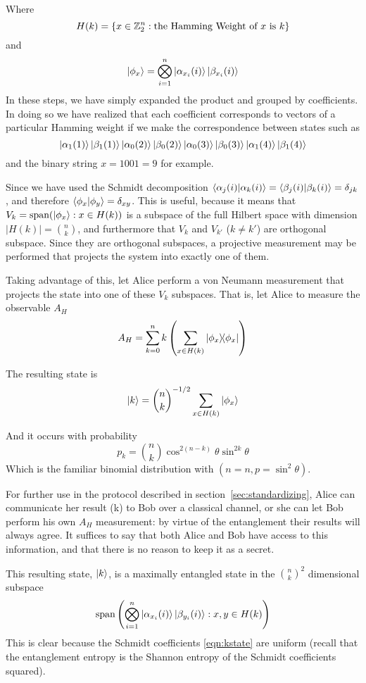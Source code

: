 Where 
$$
H(k) = \left\{ 
x \in \mathbb{Z}_2^n : \text{the Hamming Weight of $x$ is $k$} 
\right\}
$$
and
$$
\ket{\phi_x} = \bigotimes_{i=1}^n 
\ket{\alpha_{x_i}(i)} \ket{\beta_{x_i}(i)}
$$
In these steps, we have simply expanded the product and grouped by coefficients. In doing so we have realized that each coefficient corresponds to vectors of a particular Hamming weight if we make the correspondence between states such as
$$\ket{\alpha_1(1)} \ket{\beta_1(1)} \ket{\alpha_0(2)} \ket{\beta_0(2)} \ket{\alpha_0(3)} \ket{\beta_0(3)} \ket{\alpha_1(4)} \ket{\beta_1(4)}$$
and the binary string $x = 1001 = 9$ for example.

Since we have used the Schmidt decomposition $ \braket{\alpha_j(i)}{\alpha_k(i)} = \braket{\beta_j(i)}{\beta_k(i)} = \delta_{jk} $, and therefore $\braket{\phi_x}{\phi_y} = \delta_{xy}$.
This is useful, because it means that $V_k = \text{span}(\ket{\phi_x} : x \in H(k))$ is a subspace of the full Hilbert space with dimension $|H(k)| = \binom{n}{k}$, and furthermore that $V_k$ and $V_{k'}$ ($k\neq k'$) are orthogonal subspace.
Since they are orthogonal subspaces, a projective measurement may be performed that projects the system into exactly one of them.

Taking advantage of this, let Alice perform a von Neumann measurement that projects the state into one of these $V_k$ subspaces. That is, let Alice to measure the observable $A_H$
$$
A_H = \sum_{k=0}^n k \left( \sum_{x \in H(k)}  \dyad{\phi_x}{\phi_x} \right) 
$$

The resulting state is
\begin{equation}
\label{eqn:kstate}
\ket{k} = \binom{n}{k}^{-1/2} \sum_{x \in H(k)} \ket{\phi_x}
\end{equation}

And it occurs with probability
$$
p_k = \binom{n}{k} \cos^{2(n-k)}\theta \sin^{2k}\theta
$$
Which is the familiar binomial distribution with $(n=n, p=\sin^2\theta)$.

For further use in the protocol described in section~\ref{sec:standardizing}, Alice can communicate her result (k) to Bob over a classical channel, or she can let Bob perform his own $A_H$ measurement: by virtue of the entanglement their results will always agree. It suffices to say that both Alice and Bob have access to this information, and that there is no reason to keep it as a secret.

This resulting state, $\ket{k}$,  is a maximally entangled state in the $\binom{n}{k}^2$ dimensional subspace 
$$\text{span}\left(\bigotimes_{i=1}^n 
\ket{\alpha_{x_i}(i)} \ket{\beta_{y_i}(i)}: x,y \in H(k)\right)
$$
This is clear because the Schmidt coefficients \eqref{eqn:kstate} are uniform (recall that the entanglement entropy is the Shannon entropy of the Schmidt coefficients squared).

